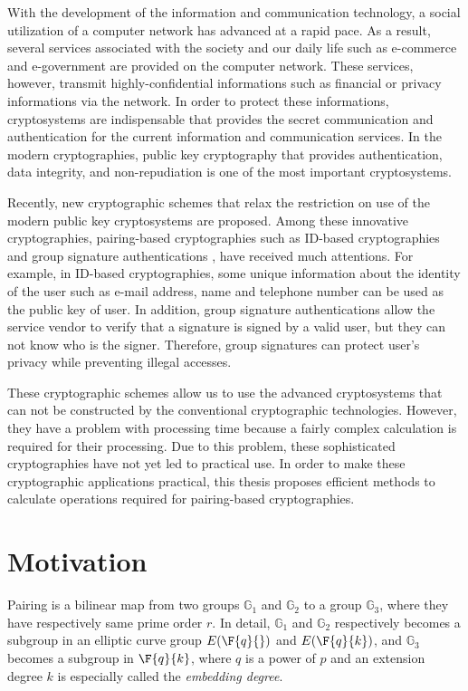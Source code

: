 With  the development of the information and communication technology, a social utilization of a computer network has advanced at a rapid pace.
As a result, several services associated with the society and our daily life such as e-commerce and e-government are provided on the computer network.
These services, however, transmit highly-confidential informations such as financial or privacy informations via the network.
In order to protect these informations, cryptosystems are indispensable that provides the secret communication and authentication for the current information and communication services.
In the modern cryptographies, public key cryptography that provides authentication, data integrity, and non-repudiation is one of the most important cryptosystems.

Recently, new cryptographic schemes that relax the restriction on use of the modern public key cryptosystems are proposed.
Among these innovative cryptographies, pairing-based cryptographies such as ID-based cryptographies \cite{ID} and group signature authentications \cite{BBS}, \cite{nakanisi} have received much attentions.
For example, in ID-based cryptographies, some unique information about the identity of the user such as e-mail address, name and telephone number can be used as the public key of user.
In addition, group signature authentications allow the service vendor to verify that a signature is signed by a valid user, but they can not know who is the signer.
Therefore, group signatures can protect user's privacy while preventing illegal accesses.

These cryptographic schemes allow us to use the advanced cryptosystems that can not be constructed by the conventional cryptographic technologies.
However, they have a problem with processing time because a fairly complex calculation is required for their processing.  
Due to this problem, these sophisticated cryptographies have not yet led to practical use.   
In order to make these cryptographic applications practical, this thesis proposes efficient methods to calculate operations required for pairing-based cryptographies.

\section{Motivation}
Pairing is a bilinear map from two groups $\mathbb{G}_1$ and $\mathbb{G}_2$ to a group $\mathbb{G}_3$, where they have respectively same prime order $r$.
In detail, $\mathbb{G}_1$ and $\mathbb{G}_2$ respectively becomes a subgroup in an elliptic curve group $E(\F{q}{})$ and $E(\F{q}{k})$, and $\mathbb{G}_3$ becomes a subgroup in $\F{q}{k}$, where $q$ is a power of $p$ and an extension degree $k$ is especially called the {\it embedding degree}.
 
